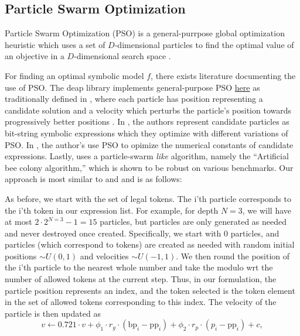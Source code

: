 \documentclass[runningheads]{llncs}
\begin{document}
\subsection{Particle Swarm Optimization} \label{subsec:ParticleSwarmOptimization}
Particle Swarm Optimization (PSO) is a general-purrpose global optimization heuristic which uses a set of $D$-dimensional particles to find the optimal value of an objective in a $D$-dimensional search space \cite{clerc:hal-00764996}. 
\par For finding an optimal symbolic model $f$, there exists literature documenting the use of PSO. The deap library implements general-purpose PSO \href{https://github.com/DEAP/deap/blob/60913c5543abf8318ddce0492e8ffcdf37974d86/examples/pso/basic.py}{here} as traditionally defined in \cite{PoliOverviewPSO}, where each particle has position representing a candidate solution and a velocity which perturbs the particle's position towards progressively better positions \cite{DEAP_JMLR2012}. In \cite{10.1007/978-3-319-70093-9_37}, the authors represent candidate particles as bit-string symbolic expressions which they optimize with different variations of PSO. In \cite{Lu2021}, the author's use PSO to opimize the numerical constants of candidate expressions. Lastly, \cite{KARABOGA20121} uses a particle-swarm \emph{like} algorithm, namely the ``Artificial bee colony algorithm,'' which is shown to be robust on various benchmarks. Our approach is most similar to \cite{DEAP_JMLR2012} and \cite{10.1007/978-3-319-70093-9_37} and is as follows:
\par As before, we start with the set of legal tokens. The i'th particle corresponds to the i'th token in our expression list. For example, for depth $N = 3$, we will have at most $2\cdot 2^{N = 3} - 1 = 15$ particles, but particles are only generated as needed and never destroyed once created. Specifically, we start with 0 particles, and particles (which correspond to tokens) are created as needed with random initial positions $\sim U(0,1)$ and velocities $\sim U(-1,1)$. We then round the position of the i'th particle to the nearest whole number and take the modulo wrt the number of allowed tokens at the current step. Thus, in our formulation, the particle position represents an index, and the token selected is the token element in the set of allowed tokens corresponding to this index. The velocity of the particle is then updated as \cite{clerc:hal-00764996} \cite{offShellPSO}
\begin{equation}
		v \gets 0.721\cdot v + \phi_1 \cdot r_g \cdot (\mathrm{bp}_i - \mathrm{pp}_i) + \phi_2\cdot r_p \cdot (p_i - \mathrm{pp}_i) + c,
\end{equation}
\end{document}
